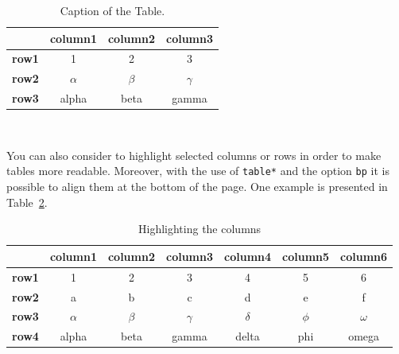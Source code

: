 \documentclass[11pt,a4paper]{article}
\begin{document}
\begin{table}[H]
	\caption*{\textbf{Example of Table (optional)}}
	\centering
	\begin{tabular}{|p{3em} c c c |}
		\hline
		\rowcolor{bluePoli!40}
		              & \textbf{column1} & \textbf{column2} & \textbf{column3} \T\B \\
		\hline \hline
		\textbf{row1} & 1                & 2                & 3 \T\B                \\
		\textbf{row2} & $\alpha$         & $\beta$          & $\gamma$ \T\B         \\
		\textbf{row3} & alpha            & beta             & gamma \B              \\
		\hline
	\end{tabular}
	\\[10pt]
	\caption{Caption of the Table.}
	\label{table:example}
\end{table}

You can also consider to highlight selected columns or rows in order to make tables more readable.
Moreover, with the use of \texttt{table*} and the option \texttt{bp} it is possible to align them at the bottom of the page. One example is presented in Table~\ref{table:exampleC}.

\begin{table}[bp]
	\centering
	\begin{tabular}{|p{3em} | c | c | c | c | c | c|}
		\hline
		              & \textbf{column1} & \textbf{column2} & \textbf{column3} & \textbf{column4} & \textbf{column5} & \textbf{column6} \T\B \\
		\hline \hline
		\textbf{row1} & 1                & 2                & 3                & 4                & 5                & 6 \T\B                \\
		\textbf{row2} & a                & b                & c                & d                & e                & f \T\B                \\
		\textbf{row3} & $\alpha$         & $\beta$          & $\gamma$         & $\delta$         & $\phi$           & $\omega$ \T\B         \\
		\textbf{row4} & alpha            & beta             & gamma            & delta            & phi              & omega \B              \\
		\hline
	\end{tabular}
	\\[10pt]
	\caption{Highlighting the columns}
	\label{table:exampleC}
\end{table}
\end{document}
